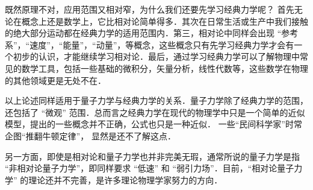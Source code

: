 既然原理不对，应用范围又相对窄，为什么我们还要先学习经典力学呢？ 首先无论在概念上还是数学上，它比相对论简单得多．其次在日常生活或生产中我们接触的绝大部分运动都在经典力学的适用范围内．第三，相对论中同样会出现 “参考系”，“速度”，“能量”，“动量”，等概念，这些概念只有先学习经典力学才会有一个初步的认识，才能继续学习相对论．最后，通过学习经典力学可以了解物理中常见的数学工具，包括一些基础的微积分，矢量分析，线性代数等，这些数学在物理的其他领域更是无处不在．

以上论述同样适用于量子力学与经典力学的关系．量子力学除了经典力学的范围，还包括了 “微观” 范围．总而言之经典力学在现代的物理学中只是一个简单的近似模型，提出的一些概念并不正确，公式也只是一种近似． 一些“民间科学家”时常企图“推翻牛顿定律”， 显然是还不了解这点．

另一方面，即使是相对论和量子力学也并非完美无瑕，通常所说的量子力学是指 “非相对论量子力学”，即同样要求 “低速” 和 “弱引力场”．目前，“相对论量子力学” 的理论还并不完善，是许多理论物理学家努力的方向．




